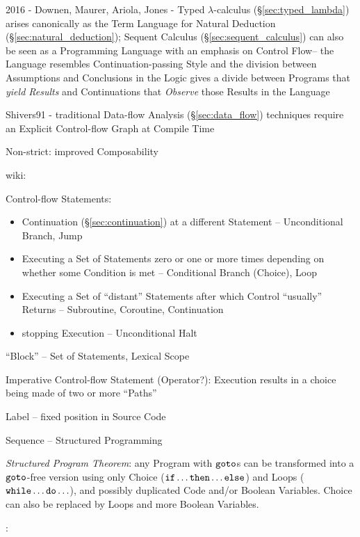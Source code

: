 2016 - Downen, Maurer, Ariola, Jones - Typed $\lambda$-calculus
(\S\ref{sec:typed_lambda}) arises canonically as the Term Language for Natural
Deduction (\S\ref{sec:natural_deduction}); Sequent Calculus
(\S\ref{sec:sequent_calculus}) can also be seen as a Programming Language with
an emphasis on Control Flow-- the Language resembles Continuation-passing Style
and the division between Assumptions and Conclusions in the Logic gives a
divide between Programs that \emph{yield Results} and Continuations that
\emph{Observe} those Results in the Language


\asterism


Shivers91 - traditional Data-flow Analysis (\S\ref{sec:data_flow})
techniques require an Explicit Control-flow Graph at Compile Time

Non-strict: improved Composability %


wiki:

Control-flow Statements:
\begin{itemize}
  \item Continuation (\S\ref{sec:continuation}) at a different
    Statement -- Unconditional Branch, Jump
  \item Executing a Set of Statements zero or one or more times
    depending on whether some Condition is met -- Conditional Branch
    (Choice), Loop
  \item Executing a Set of ``distant'' Statements after which Control
    ``usually'' Returns -- Subroutine, Coroutine, Continuation
  \item stopping Execution -- Unconditional Halt
\end{itemize}

``Block'' -- Set of Statements, Lexical Scope %

Imperative Control-flow Statement (Operator?): Execution results in a
choice being made of two or more ``Paths''

Label -- fixed position in Source Code

Sequence -- Structured Programming

\emph{Structured Program Theorem}: any Program with $\mathtt{goto}$s can
be transformed into a $\mathtt{goto}$-free version using only Choice
($\mathtt{if}\ldots\mathtt{then}\ldots\mathtt{else}$) and Loops
($\mathtt{while}\ldots\mathtt{do}\ldots$), and possibly duplicated Code
and/or Boolean Variables. Choice can also be replaced by Loops and
more Boolean Variables.


\asterism


\cite{selinger01}:

